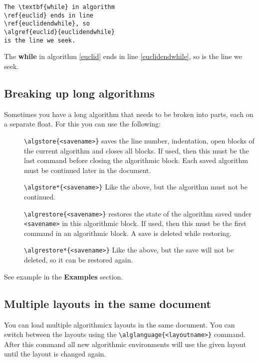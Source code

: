 \documentclass{jsarticle}
\begin{document}
\noindent\begin{minipage}[t]{0.5\linewidth}
\begin{verbatim}
The \textbf{while} in algorithm
\ref{euclid} ends in line
\ref{euclidendwhile}, so
\algref{euclid}{euclidendwhile}
is the line we seek.
\end{verbatim}
\end{minipage}\begin{minipage}[t]{0.5\linewidth}
The \textbf{while} in algorithm \ref{euclid} ends in line \ref{euclidendwhile},
so  is the line we seek.
\end{minipage}

\subsection{Breaking up long algorithms}

Sometimes you have a long algorithm that needs to be broken into parts, each on a
separate float. For this you can use the following:

\begin{description}
\item[]\verb:\algstore{<savename>}: saves the line number, indentation, open blocks of
the current algorithm and closes all blocks. If used, then this must be the last command
before closing the algorithmic block. Each saved algorithm must be continued later in the
document.
\item[]\verb:\algstore*{<savename>}: Like the above, but the algorithm must not be continued.
\item[]\verb:\algrestore{<savename>}: restores the state of the algorithm saved under
\verb:<savename>: in this algorithmic block. If used, then this must be the first command
in an algorithmic block. A save is deleted while restoring.
\item[]\verb:\algrestore*{<savename>}: Like the above, but the save will not be deleted, so it
can be restored again.
\end{description}

See example in the \textbf{Examples} section.

\subsection{Multiple layouts in the same document}

You can load multiple algorithmicx layouts in the same document. You can switch between the layouts
using the \verb:\alglanguage{<layoutname>}: command. After this command all new algorithmic
environments will use the given layout until the layout is changed again.
\end{document}
